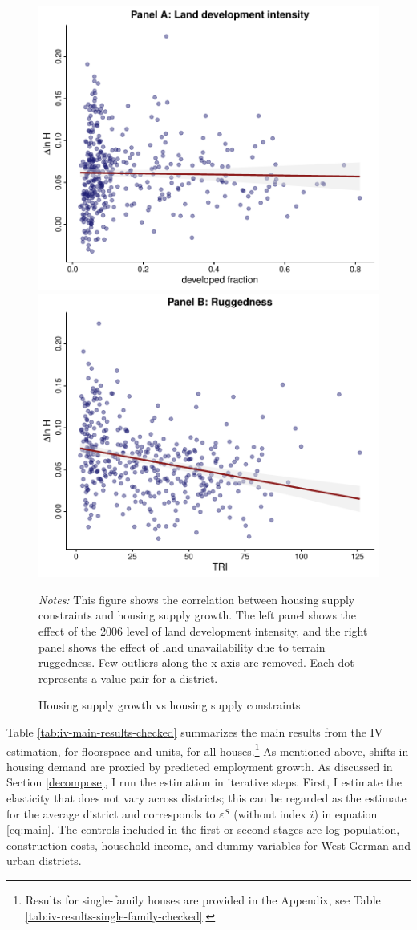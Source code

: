 \documentclass[
  12pt,
]{article}
\begin{document}
\begin{figure}[H]
\centering

\begin{center}\includegraphics[width=0.49\linewidth]{output/figs/scatter-supply-constraints-1} \includegraphics[width=0.49\linewidth]{output/figs/scatter-supply-constraints-2} \end{center}

\caption{Housing supply growth vs housing supply constraints}\label{fig:scatter-supply-constraints}
\medskip
\begin{minipage}{0.9\textwidth}
\footnotesize
\textit{Notes:} This figure shows the correlation between housing supply constraints and housing supply growth. The left panel shows the effect of the 2006 level of land development intensity, and the right panel shows the effect of land unavailability due to terrain ruggedness. Few outliers along the x-axis are removed. Each dot represents a value pair for a district. 
\end{minipage}
\end{figure}

Table \ref{tab:iv-main-results-checked} summarizes the main results from the IV estimation, for floorspace and units, for all houses.\footnote{Results for single-family houses are provided in the Appendix, see Table \ref{tab:iv-results-single-family-checked}.} As mentioned above, shifts in housing demand are proxied by predicted employment growth. As discussed in Section \ref{decompose}, I run the estimation in iterative steps. First, I estimate the elasticity that does not vary across districts; this can be regarded as the estimate for the average district and corresponds to \(\varepsilon^S\) (without index \(i\)) in equation \eqref{eq:main}. The controls included in the first or second stages are log population, construction costs, household income, and dummy variables for West German and urban districts.
\end{document}

